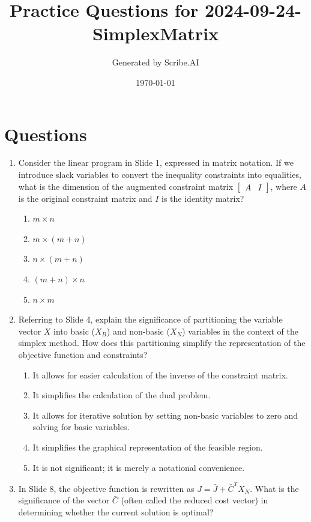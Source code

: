 \documentclass{article}%
\title{Practice Questions for 2024{-}09{-}24{-}SimplexMatrix}%
\author{Generated by Scribe.AI}%
\date{\today}%
\begin{document}
%
\normalsize%
\maketitle%
\section{Questions}%
\label{sec:Questions}%
\begin{enumerate}%
\item Consider the linear program in Slide 1, expressed in matrix notation.  If we introduce slack variables to convert the inequality constraints into equalities, what is the dimension of the augmented constraint matrix $\begin{bmatrix} A & I \end{bmatrix}$, where $A$ is the original constraint matrix and $I$ is the identity matrix?%
\begin{enumerate}%
\item $m \times n$%
\item $m \times (m+n)$%
\item $n \times (m+n)$%
\item $(m+n) \times n$%
\item $n \times m$%
\end{enumerate}%
\vspace{1em}%
\item Referring to Slide 4, explain the significance of partitioning the variable vector $X$ into basic ($X_B$) and non-basic ($X_N$) variables in the context of the simplex method. How does this partitioning simplify the representation of the objective function and constraints?%
\begin{enumerate}%
\item It allows for easier calculation of the inverse of the constraint matrix.%
\item It simplifies the calculation of the dual problem.%
\item It allows for iterative solution by setting non-basic variables to zero and solving for basic variables.%
\item It simplifies the graphical representation of the feasible region.%
\item It is not significant; it is merely a notational convenience.%
\end{enumerate}%
\vspace{1em}%
\item In Slide 8, the objective function is rewritten as $J = \bar{J} + \bar{C}^T X_N$. What is the significance of the vector $\bar{C}$ (often called the reduced cost vector) in determining whether the current solution is optimal?%

\end{enumerate}
\end{document}

